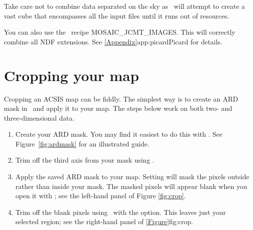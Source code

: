 \documentclass[11pt,oneside,chapters]{starlink}
\begin{document}
\begin{tip}
Take care not to combine data separated on the sky as \wcsmosaic\
will attempt to create a vast cube that encompasses all the input
files until it runs out of resources.
\end{tip}

\begin{tip}
You can also use the \picard\ recipe MOSAIC\_JCMT\_IMAGES. This
will correctly combine all NDF extensions. See
\cref{Appendix}{app:picard}{Picard} for details.
\end{tip}

\newpage
\section{Cropping your map}
\label{sec:collapse}

Cropping an ACSIS map can be fiddly. The simplest way is to create an
ARD mask in \gaia\ and apply it to your map. The steps below work on
both two- and three-dimensional data.

\begin{enumerate}[label=(\arabic*)]
\item Create your ARD mask. You may find it easiest to do this with
\gaia. See Figure~\ref{fig:ardmask} for an illustrated guide.

\item Trim off the third axis from your mask using \ndfcopy.
\begin{terminalv}
\end{terminalv}

\item Apply the saved ARD mask to your map. Setting
 will mask the pixels outside rather than inside
your mask. The masked pixels will appear blank when you open it with
\gaia; see the left-hand panel of Figure \ref{fig:crop}.
\begin{terminalv}
\end{terminalv}

\item Trim off the blank pixels using \ndfcopy\ with the
 option. This leaves just your selected region; see the
right-hand panel of \cref{Figure}{fig:crop}{}.
\begin{terminalv}
\end{terminalv}
\end{enumerate}
\end{document}
